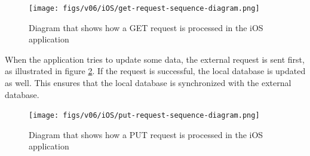 \begin{figure}
    \texttt{[image: figs/v06/iOS/get-request-sequence-diagram.png]}
    \caption{Diagram that shows how a GET request is processed in the iOS application}
    \label{fig:ios-get-request-process-6}
\end{figure}

When the application tries to update some data, the external request is sent first, as illustrated in figure \ref{fig:ios-put-request-process-6}. If the request is successful, the local database is updated as well. This ensures that the local database is synchronized with the external database.

\begin{figure}
    \texttt{[image: figs/v06/iOS/put-request-sequence-diagram.png]}
    \caption{Diagram that shows how a PUT request is processed in the iOS application}
    \label{fig:ios-put-request-process-6}
\end{figure}